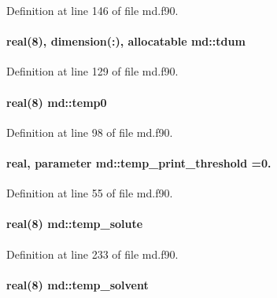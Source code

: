 Definition at line 146 of file md.\-f90.

\hypertarget{classmd_a306199abbe1732a3f31f0b5f7a80f249}{
\paragraph[{tdum}]{\setlength{\rightskip}{0pt plus 5cm}real(8), dimension(\-:), allocatable md\-::tdum}}\label{classmd_a306199abbe1732a3f31f0b5f7a80f249}


Definition at line 129 of file md.\-f90.

\hypertarget{classmd_ac81d21f541b0c26e6db7c5fa3aafba49}{
\paragraph[{temp0}]{\setlength{\rightskip}{0pt plus 5cm}real(8) md\-::temp0}}\label{classmd_ac81d21f541b0c26e6db7c5fa3aafba49}


Definition at line 98 of file md.\-f90.

\hypertarget{classmd_a43d2692536b8153c4d909890ae0810c6}{
\paragraph[{temp\-\_\-print\-\_\-threshold}]{\setlength{\rightskip}{0pt plus 5cm}real, parameter md\-::temp\-\_\-print\-\_\-threshold =0.}}\label{classmd_a43d2692536b8153c4d909890ae0810c6}


Definition at line 55 of file md.\-f90.

\hypertarget{classmd_ae90b61f6150810cd40b059f4d3df6f70}{
\paragraph[{temp\-\_\-solute}]{\setlength{\rightskip}{0pt plus 5cm}real(8) md\-::temp\-\_\-solute}}\label{classmd_ae90b61f6150810cd40b059f4d3df6f70}


Definition at line 233 of file md.\-f90.

\hypertarget{classmd_afcc462c82be9deb130a281435450ec2d}{
\paragraph[{temp\-\_\-solvent}]{\setlength{\rightskip}{0pt plus 5cm}real(8) md\-::temp\-\_\-solvent}}\label{classmd_afcc462c82be9deb130a281435450ec2d}


